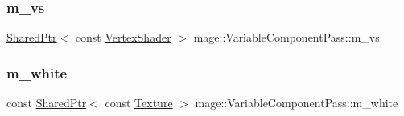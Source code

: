 \subsubsection{\texorpdfstring{m\+\_\+vs}{m\_vs}}
{\footnotesize\ttfamily \hyperlink{namespacemage_a1e01ae66713838a7a67d30e44c67703e}{Shared\+Ptr}$<$ const \hyperlink{classmage_1_1_vertex_shader}{Vertex\+Shader} $>$ mage\+::\+Variable\+Component\+Pass\+::m\+\_\+vs\hspace{0.3cm}{\ttfamily [private]}}

\hypertarget{classmage_1_1_variable_component_pass_a2b018f6481e6e5aa043223ce6821725d}{}\label{classmage_1_1_variable_component_pass_a2b018f6481e6e5aa043223ce6821725d} 
\subsubsection{\texorpdfstring{m\+\_\+white}{m\_white}}
{\footnotesize\ttfamily const \hyperlink{namespacemage_a1e01ae66713838a7a67d30e44c67703e}{Shared\+Ptr}$<$ const \hyperlink{classmage_1_1_texture}{Texture} $>$ mage\+::\+Variable\+Component\+Pass\+::m\+\_\+white\hspace{0.3cm}{\ttfamily [private]}}

